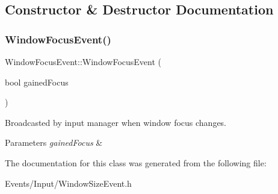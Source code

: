 \subsection{Constructor \& Destructor Documentation}
\mbox{\label{classWindowFocusEvent_a9d8ad41bf0ce0be64b35f607c8480f9f}} 
\subsubsection{\texorpdfstring{Window\+Focus\+Event()}{WindowFocusEvent()}}
{\footnotesize\ttfamily Window\+Focus\+Event\+::\+Window\+Focus\+Event (\begin{DoxyParamCaption}\item[{bool}]{gained\+Focus }\end{DoxyParamCaption})\hspace{0.3cm}{\ttfamily [inline]}}



Broadcasted by input manager when window focus changes. 


\begin{DoxyParams}{Parameters}
{\em gained\+Focus} & \\
\hline
\end{DoxyParams}


The documentation for this class was generated from the following file\+:\begin{DoxyCompactItemize}
\item 
Events/\+Input/Window\+Size\+Event.\+h\end{DoxyCompactItemize}
